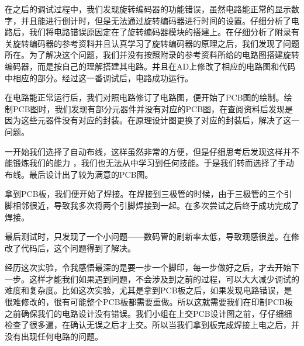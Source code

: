 \documentclass{../source/Experiment}
\begin{document}
    在之后的调试过程中，我们发现旋转编码器的功能错误，虽然电路能正常的显示数字，并且能进行倒计时，但是无法通过旋转编码器进行时间的设置。仔细分析了电路后，我们将电路错误原因定在了旋转编码器模块的搭建上。在仔细分析了附录有关旋转编码器的参考资料并且认真学习了旋转编码器的原理之后，我们发现了问题所在。为了解决这个问题，我们并没有按照附录的参考资料所给的电路图搭建旋转编码器，而是按自己的理解搭建其电路。并且在AD上修改了相应的电路图和代码中相应的部分。经过这一番调试后，电路成功运行。

    在电路能正常运行后，我们对照电路修订了电路图，便开始了PCB图的绘制。绘制PCB图时，我们发现有部分元器件并没有对应的PCB图，在查阅资料后发现是因为这些元器件没有对应的封装。在原理设计图更换了对应的封装后，解决了这一问题。

    一开始我们选择了自动布线，这样虽然非常的方便，但是仔细思考后发现这样并不能锻炼我们的能力 ，我们也无法从中学习到任何技能。于是我们转而选择了手动布线。最后设计出了较为满意的PCB图。

    拿到PCB板，我们便开始了焊接。在焊接到三极管的时候，由于三极管的三个引脚相邻很近，导致我多次将两个引脚焊接到一起。在多次尝试之后终于成功完成了焊接。

    最后测试时，只发现了一个小问题——数码管的刷新率太低，导致观感很差。在修改了代码后，这个问题得到了解决。

    经历这次实验，令我感悟最深的是要一步一个脚印，每一步做好之后，才去开始下一步。这样才能我们如果遇到问题，不会涉及到之前的过程，可以大大减少调试的难度和复杂度。比如这次实验，尤其是拿到PCB板之后，如果发现电路错误，是很难修改的，很有可能整个PCB板都需要重做。所以这就需要我们在印制PCB板之前确保我们的电路设计没有错误。我们小组在上交PCB设计图之前，仔仔细细检查了很多遍，在确认无误之后才上交。所以当我们拿到板完成焊接上电之后，并没有出现任何电路的问题。
\end{document}
